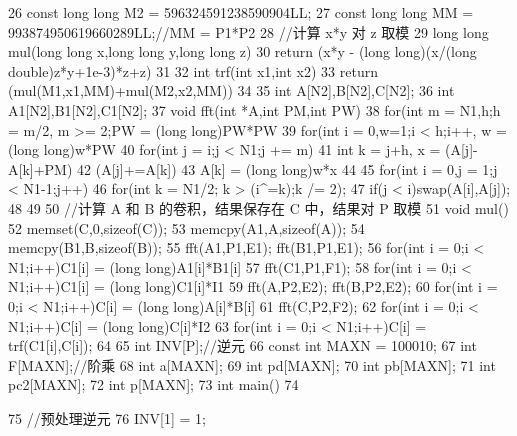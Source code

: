 \documentclass[11pt]{article}
\begin{document}
\begin{Code}
26   const long long M2 = 596324591238590904LL;
27   const long long MM = 993874950619660289LL;//MM = P1*P2
28   //计算 x*y 对 z 取模
29   long long mul(long long x,long long y,long long z){
30       return (x*y - (long long)(x/(long double)z*y+1e-3)*z+z)%
31   }
32   int trf(int x1,int x2){
33       return (mul(M1,x1,MM)+mul(M2,x2,MM))%
34   }
35   int A[N2],B[N2],C[N2];
36   int A1[N2],B1[N2],C1[N2];
37   void fft(int *A,int PM,int PW){
38       for(int m = N1,h;h = m/2, m >= 2;PW = (long long)PW*PW%
39           for(int i = 0,w=1;i < h;i++, w = (long long)w*PW%
40                for(int j = i;j < N1;j += m){
41                    int k = j+h, x = (A[j]-A[k]+PM)%
42                    (A[j]+=A[k])%
43                    A[k] = (long long)w*x%
44                }
45       for(int i = 0,j = 1;j < N1-1;j++){
46           for(int k = N1/2; k > (i^=k);k /= 2);
47           if(j < i)swap(A[i],A[j]);
48       }
49   }
50   //计算 A 和 B 的卷积，结果保存在 C 中，结果对 P 取模
51   void mul(){
52       memset(C,0,sizeof(C));
53       memcpy(A1,A,sizeof(A));
54       memcpy(B1,B,sizeof(B));
55       fft(A1,P1,E1); fft(B1,P1,E1);
56       for(int i = 0;i < N1;i++)C1[i] = (long long)A1[i]*B1[i]%
57       fft(C1,P1,F1);
58       for(int i = 0;i < N1;i++)C1[i] = (long long)C1[i]*I1%
59       fft(A,P2,E2); fft(B,P2,E2);
60       for(int i = 0;i < N1;i++)C[i] = (long long)A[i]*B[i]%
61       fft(C,P2,F2);
62       for(int i = 0;i < N1;i++)C[i] = (long long)C[i]*I2%
63       for(int i = 0;i < N1;i++)C[i] = trf(C1[i],C[i]);
64   }
65   int INV[P];//逆元
66   const int MAXN = 100010;
67   int F[MAXN];//阶乘
68   int a[MAXN];
69   int pd[MAXN];
70   int pb[MAXN];
71   int pc2[MAXN];
72   int p[MAXN];
73   int main()
74   {
75       //预处理逆元
76       INV[1] = 1;


}
\end{Code}
\end{document}
